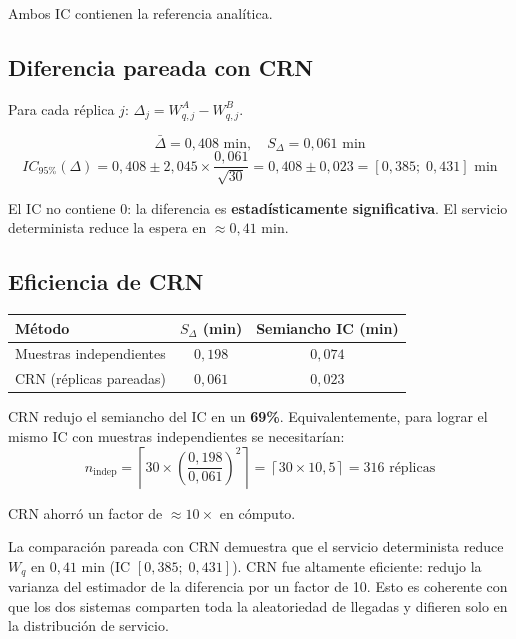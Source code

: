 \documentclass[11pt, letterpaper]{article}
\begin{document}
Ambos IC contienen la referencia analítica.

\subsection{Diferencia pareada con CRN}

Para cada réplica $j$: $\Delta_j = W_{q,j}^{A} - W_{q,j}^{B}$.

\[
\bar\Delta = 0{,}408 \text{ min}, \quad S_\Delta = 0{,}061 \text{ min}
\]
\[
IC_{95\%}(\Delta) = 0{,}408 \pm 2{,}045 \times \frac{0{,}061}{\sqrt{30}} = 0{,}408 \pm 0{,}023 = [0{,}385;\; 0{,}431] \text{ min}
\]

El IC no contiene 0: la diferencia es \textbf{estadísticamente significativa}. El servicio determinista reduce la espera en $\approx 0{,}41$ min.

\subsection{Eficiencia de CRN}

\begin{center}\small
\renewcommand{\arraystretch}{1.25}
\begin{tabular}{lcc}
\toprule
\textbf{Método} & $S_\Delta$ (min) & Semiancho IC (min) \\
\midrule
Muestras independientes & $0{,}198$ & $0{,}074$ \\
CRN (réplicas pareadas) & $0{,}061$ & $0{,}023$ \\
\bottomrule
\end{tabular}
\end{center}

CRN redujo el semiancho del IC en un \textbf{69\%}. Equivalentemente, para lograr el mismo IC con muestras independientes se necesitarían:
\[
n_{\text{indep}} = \left\lceil 30 \times \left(\frac{0{,}198}{0{,}061}\right)^2\right\rceil = \left\lceil 30 \times 10{,}5\right\rceil = 316 \text{ réplicas}
\]

CRN ahorró un factor de $\approx 10\times$ en cómputo.

\begin{resultadobox}
La comparación pareada con CRN demuestra que el servicio determinista reduce $W_q$ en $0{,}41$ min (IC $[0{,}385;\; 0{,}431]$). CRN fue altamente eficiente: redujo la varianza del estimador de la diferencia por un factor de 10. Esto es coherente con que los dos sistemas comparten toda la aleatoriedad de llegadas y difieren solo en la distribución de servicio.
\end{resultadobox}
\end{document}
